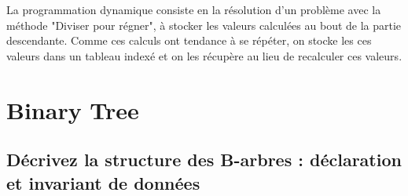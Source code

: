 \documentclass[11pt]{article}
\begin{document}
La programmation dynamique consiste en la résolution d’un problème avec la méthode "Diviser pour régner", à stocker les valeurs calculées au bout de la partie descendante. Comme ces calculs ont tendance à se répéter, on stocke les ces valeurs dans un tableau indexé et on les récupère au lieu de recalculer ces valeurs.

\section{Binary Tree}

\subsection{Décrivez la structure des B-arbres : déclaration et invariant de données}
\end{document}

